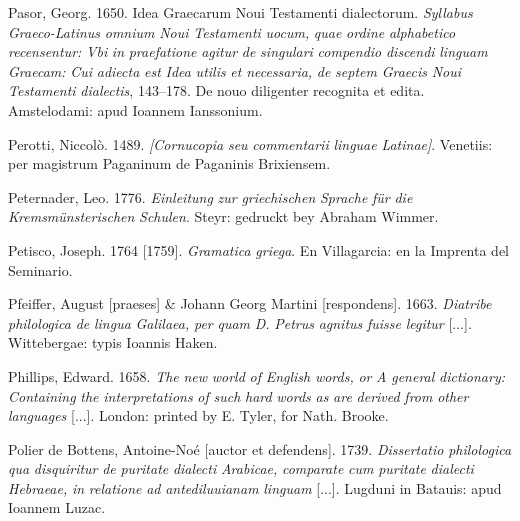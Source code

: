\documentclass[output=paper]{langsci/langscibook}
\begin{document}
Pasor, Georg. 1650. Idea Graecarum Noui Testamenti dialectorum. \textit{Syllabus} \textit{Graeco-Latinus} \textit{omnium} \textit{Noui} \textit{Testamenti} \textit{uocum,} \textit{quae} \textit{ordine} \textit{alphabetico} \textit{recensentur:} \textit{Vbi} \textit{in} \textit{praefatione} \textit{agitur} \textit{de} \textit{singulari} \textit{compendio} \textit{discendi} \textit{linguam} \textit{Graecam:} \textit{Cui} \textit{adiecta} \textit{est} \textit{Idea} \textit{utilis} \textit{et} \textit{necessaria,} \textit{de} \textit{septem} \textit{Graecis} \textit{Noui} \textit{Testamenti} \textit{dialectis}, 143–178. De nouo diligenter recognita et edita. Amstelodami: apud Ioannem Ianssonium.

Perotti, Niccolò. 1489. \textit{[Cornucopia} \textit{seu} \textit{commentarii} \textit{linguae} \textit{Latinae]}. Venetiis: per magistrum Paganinum de Paganinis Brixiensem.

Peternader, Leo. 1776. \textit{Einleitung} \textit{zur} \textit{griechischen} \textit{Sprache} \textit{für} \textit{die} \textit{Kremsmünsterischen} \textit{Schulen}. Steyr: gedruckt bey Abraham Wimmer.

Petisco, Joseph. 1764 [1759]. \textit{Gramatica} \textit{griega}. En Villagarcia: en la Imprenta del Seminario.

Pfeiffer, August [praeses] \& Johann Georg Martini [respondens]. 1663. \textit{Diatribe} \textit{philologica} \textit{de} \textit{lingua} \textit{Galilaea,} \textit{per} \textit{quam} \textit{D.} \textit{Petrus} \textit{agnitus} \textit{fuisse} \textit{legitur} [...]. Wittebergae: typis Ioannis Haken.

Phillips, Edward. 1658. \textit{The} \textit{new} \textit{world} \textit{of} \textit{English} \textit{words,} \textit{or} \textit{A} \textit{general} \textit{dictionary:} \textit{Containing} \textit{the} \textit{interpretations} \textit{of} \textit{such} \textit{hard} \textit{words} \textit{as} \textit{are} \textit{derived} \textit{from} \textit{other} \textit{languages} [...]. London: printed by E. Tyler, for Nath. Brooke.

Polier de Bottens, Antoine-Noé [auctor et defendens]. 1739. \textit{Dissertatio} \textit{philologica} \textit{qua} \textit{disquiritur} \textit{de} \textit{puritate} \textit{dialecti} \textit{Arabicae,} \textit{comparate} \textit{cum} \textit{puritate} \textit{dialecti} \textit{Hebraeae,} \textit{in} \textit{relatione} \textit{ad} \textit{antediluuianam} \textit{linguam} [...]. Lugduni in Batauis: apud Ioannem Luzac.
\end{document}
